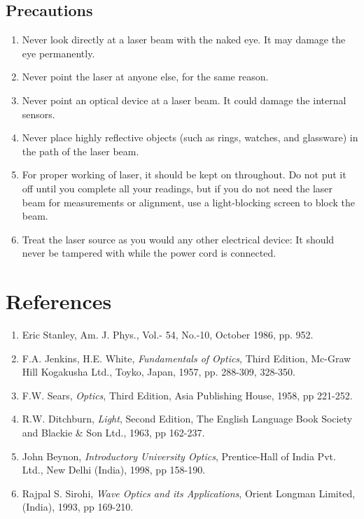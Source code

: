 \subsection*{Precautions}

\begin{enumerate}
    \item Never look directly at a laser beam with the naked eye. It may damage the eye permanently.
    \item Never point the laser at anyone else, for the same reason.
    \item Never point an optical device at a laser beam. It could damage the internal sensors.
    \item Never place highly reflective objects (such as rings, watches, and glassware) in the path of the laser beam.
    \item For proper working of laser, it should be kept on throughout. Do not put it off until you complete all your readings, but if you do not need the laser beam for measurements or alignment, use a light-blocking screen to block the  beam.
    \item Treat the laser source as you would any other electrical device: It should never be tampered with while the power cord is connected.
\end{enumerate}


\section*{References}

\begin{enumerate}
\itemsep0em
    \item Eric Stanley, Am. J. Phys., Vol.- 54, No.-10, October 1986, pp. 952.
    \item F.A. Jenkins, H.E. White, \textit{Fundamentals of Optics}, Third Edition, Mc-Graw Hill Kogakusha Ltd., Toyko, Japan, 1957, pp. 288-309, 328-350.
    \item F.W. Sears, \textit{Optics}, Third Edition, Asia Publishing House, 1958, pp 221-252.
    \item R.W. Ditchburn, \textit{Light}, Second Edition, The English Language Book Society and Blackie \& Son Ltd., 1963, pp 162-237.
    \item John Beynon, \textit{Introductory University Optics}, Prentice-Hall of India Pvt. Ltd., New Delhi (India), 1998, pp 158-190.
    \item Rajpal S. Sirohi, \textit{Wave Optics and its Applications}, Orient Longman Limited, (India), 1993, pp 169-210.
\end{enumerate}



\newpage